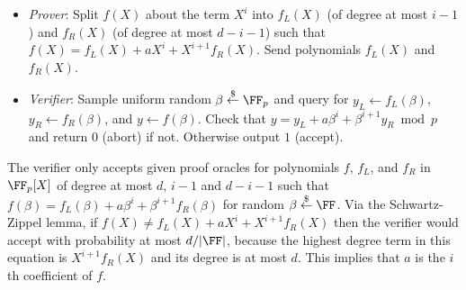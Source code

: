 \begin{itemize}

\item \emph{Prover}: Split $f(X)$ about the term $X^i$ into  $f_L(X)$ (of degree at most $i-1$) and $f_R(X)$ (of degree at most $d-i-1$) such that $f(X) = f_L(X) + a X^i + X^{i+1} f_R(X)$. Send polynomials $f_L(X)$ and $f_R(X)$. 


\item \emph{Verifier}: Sample uniform random  $\beta \sample \FF_p$ and query for $y_L \leftarrow f_L(\beta)$, $y_R \leftarrow f_R(\beta)$, and $y \leftarrow f(\beta)$. 
Check that $y = y_L + a \beta^i + \beta^{i+1} y_R \bmod p$ and return $0$ (abort) if not. Otherwise output $1$ (accept). 



\end{itemize}

The verifier only accepts given proof oracles for polynomials $f$, $f_L$, and $f_R$ in $\FF_p[X]$ of degree at most $d$, $i-1$ and $d-i-1$ such that $f(\beta) = f_L(\beta) + a\beta^i + \beta^{i+1} f_R(\beta)$ for random $\beta \sample \FF$. Via the Schwartz-Zippel lemma, if $f(X) \neq f_L(X) + aX^i + X^{i+1}f_R(X)$ then the verifier would accept with probability at most $d/|\FF|$, because the highest degree term in this equation is $X^{i+1} f_R(X)$ and its degree is at most $d$. This implies that $a$ is the $i$th coefficient of $f$. %

